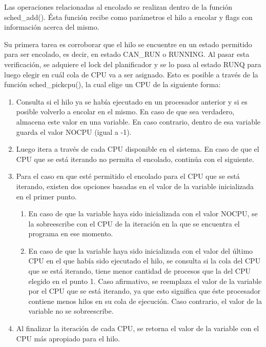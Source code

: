 Las operaciones relacionadas al encolado se realizan dentro de la función sched\_add(). Ésta función recibe como parámetros el hilo a encolar y flags con información acerca del mismo.\par

Su primera tarea es corroborar que el hilo se encuentre en un estado permitido para ser encolado, es decir, en estado CAN\_RUN o RUNNING. Al pasar esta verificación, se adquiere el lock del planificador y se lo pasa al estado RUNQ para luego elegir en cuál cola de CPU va a ser asignado. Esto es posible a través de la función sched\_pickcpu(), la cual elige un CPU de la siguiente forma:

\begin{enumerate}
    \item Consulta si el hilo ya se había ejecutado en un procesador anterior y si es posible volverlo a encolar en el mismo. En caso de que sea verdadero, almacena este valor en una variable. En caso contrario, dentro de esa variable guarda el valor NOCPU (igual a -1).
    \item Luego itera a través de cada CPU disponible en el sistema. En caso de que el CPU que se está iterando no permita el encolado, continúa con el siguiente.
    \item Para el caso en que esté permitido el encolado para el CPU que se está iterando, existen dos opciones basadas en el valor de la variable inicializada en el primer punto.
    \begin{enumerate}
        \item En caso de que la variable haya sido inicializada con el valor NOCPU, se la sobreescribe con el CPU de la iteración en la que se encuentra el programa en ese momento.
        \item En caso de que la variable haya sido inicializada con el valor del último CPU en el que había sido ejecutado el hilo, se consulta si la cola del CPU que se está iterando, tiene menor cantidad de procesos que la del CPU elegido en el punto 1. Caso afirmativo, se reemplaza el valor de la variable por el CPU que se está iterando, ya que esto significa que éste procesador contiene menos hilos en su cola de ejecución. Caso contrario, el valor de la variable no se sobreescribe.
    \end{enumerate}
    \item Al finalizar la iteración de cada CPU, se retorna el valor de la variable con el CPU más apropiado para el hilo.
\end{enumerate}

